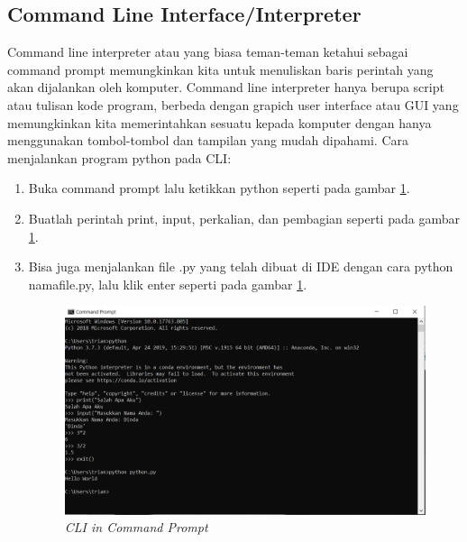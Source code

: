 \subsection{Command Line Interface/Interpreter}
Command line interpreter atau yang biasa teman-teman ketahui sebagai command prompt memungkinkan kita untuk menuliskan baris perintah yang akan dijalankan oleh komputer. Command line interpreter hanya berupa script atau tulisan kode program, berbeda dengan grapich user interface atau GUI yang memungkinkan kita memerintahkan sesuatu kepada komputer dengan hanya menggunakan tombol-tombol dan tampilan yang mudah dipahami.
Cara menjalankan program python pada CLI:
\begin{enumerate}
\item Buka command prompt lalu ketikkan python seperti pada gambar \ref{CLI}.
\item Buatlah perintah print, input, perkalian, dan pembagian seperti pada gambar \ref{CLI}.
\item Bisa juga menjalankan file .py yang telah dibuat di IDE dengan cara python namafile.py, lalu klik enter seperti pada gambar \ref{CLI}.
\begin{figure}[H]
    \centering
    \includegraphics[scale=0.4]{figures/cli}
    \caption{\textit{CLI in Command Prompt}}
    \label{CLI}
\end{figure}
\end{enumerate}